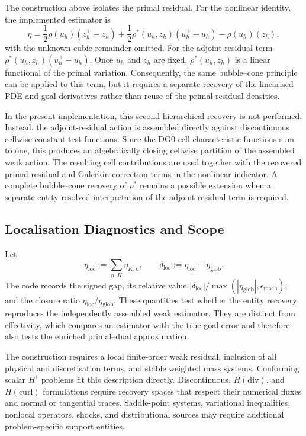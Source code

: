 The construction above isolates the primal residual. For the nonlinear identity, the implemented estimator is
\begin{equation}
 \eta
 =
 \frac12\rho(u_h)(z_h^+-z_h)
 +\frac12\rho^\ast(u_h,z_h)(u_h^+-u_h)
 -\rho(u_h)(z_h),
 \label{eq:symmetric-nonlinear-dwr}
\end{equation}
with the unknown cubic remainder omitted. For the adjoint-residual term \(\rho^\ast(u_h,z_h)(u_h^+-u_h)\). Once \(u_h\) and \(z_h\) are fixed, \(\rho^\ast(u_h,z_h)\) is a linear functional of the primal variation. Consequently, the same bubble--cone principle can be applied to this term, but it requires a separate recovery of the linearised PDE and goal derivatives rather than reuse of the primal-residual densities.

In the present implementation, this second hierarchical recovery is not performed. Instead, the adjoint-residual action is assembled directly against discontinuous cellwise-constant test functions. Since the DG0 cell characteristic functions sum to one, this produces an algebraically closing cellwise partition of the assembled weak action. 
The resulting cell contributions are used together with the recovered primal-residual and Galerkin-correction terms in the nonlinear indicator. A complete bubble--cone recovery of \(\rho^\ast\) remains a possible extension when a separate entity-resolved interpretation of the adjoint-residual term is required.



\subsection{Localisation Diagnostics and Scope}

Let
\begin{equation}
 \eta_{\mathrm{loc}}:=\sum_{n,K}\eta_{K,n},
 \qquad
 \delta_{\mathrm{loc}}
 :=\eta_{\mathrm{loc}}-\eta_{\mathrm{glob}}.
 \label{eq:localisation-gap}
\end{equation}
The code records the signed gap, its relative value \(|\delta_{\mathrm{loc}}|/\max(|\eta_{\mathrm{glob}}|,\epsilon_{\mathrm{mach}})\), 
and the closure ratio \(\eta_{\mathrm{loc}}/\eta_{\mathrm{glob}}\). These quantities test whether the entity recovery reproduces the independently assembled weak estimator. They are distinct from effectivity, which compares an estimator with the true goal error and therefore also tests the enriched primal--dual approximation.

The construction requires a local finite-order weak residual, inclusion of all physical and discretisation terms, and stable weighted mass systems. Conforming scalar \(H^1\) problems fit this description directly. Discontinuous, \(H(\mathrm{div})\), and \(H(\mathrm{curl})\) formulations require recovery spaces that respect their numerical fluxes and normal or tangential traces. Saddle-point systems, variational inequalities, nonlocal operators, shocks, and distributional sources may require additional problem-specific support entities.



